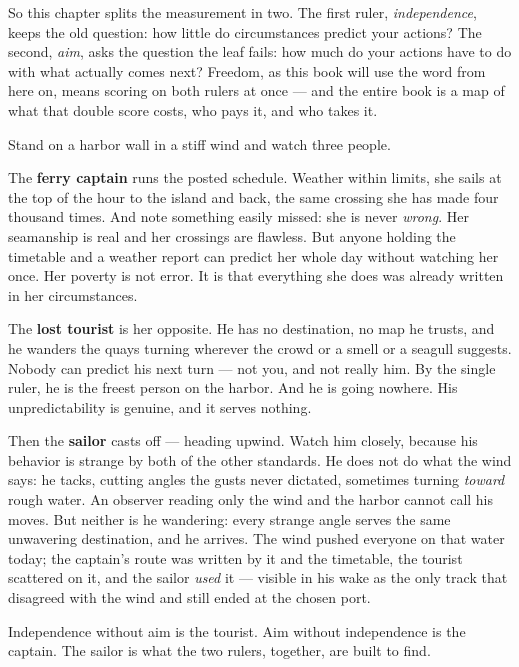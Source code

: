 So this chapter splits the measurement in two. The first ruler,
\emph{independence}, keeps the old question: how little do circumstances
predict your actions? The second, \emph{aim}, asks the question the leaf
fails: how much do your actions have to do with what actually comes
next? Freedom, as this book will use the word from here on, means scoring
on both rulers at once --- and the entire book is a map of what that
double score costs, who pays it, and who takes it.


Stand on a harbor wall in a stiff wind and watch three people.

The \textbf{ferry captain} runs the posted schedule. Weather within limits,
she sails at the top of the hour to the island and back, the same
crossing she has made four thousand times. And note something easily
missed: she is never \emph{wrong}. Her seamanship is real and her crossings
are flawless. But anyone holding the timetable and a weather report can
predict her whole day without watching her once. Her poverty is not
error. It is that everything she does was already written in her
circumstances.

The \textbf{lost tourist} is her opposite. He has no destination, no map he
trusts, and he wanders the quays turning wherever the crowd or a smell
or a seagull suggests. Nobody can predict his next turn --- not you, and
not really him. By the single ruler, he is the freest person on the
harbor. And he is going nowhere. His unpredictability is genuine, and
it serves nothing.

Then the \textbf{sailor} casts off --- heading upwind. Watch him closely,
because his behavior is strange by both of the other standards. He does
not do what the wind says: he tacks, cutting angles the gusts never
dictated, sometimes turning \emph{toward} rough water. An observer reading
only the wind and the harbor cannot call his moves. But neither is he
wandering: every strange angle serves the same unwavering destination,
and he arrives. The wind pushed everyone on that water today; the
captain's route was written by it and the timetable, the tourist
scattered on it, and the sailor \emph{used} it --- visible in his wake as the
only track that disagreed with the wind and still ended at the chosen
port.


Independence without aim is the tourist. Aim without independence is
the captain. The sailor is what the two rulers, together, are built to
find.

